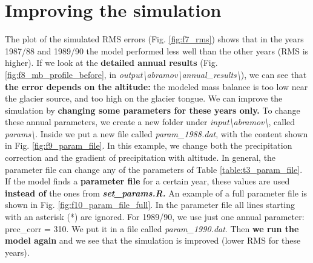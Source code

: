 \documentclass[15pt]{extarticle}
\begin{document}
\section{Improving the simulation}
\noindent The plot of the simulated RMS errors (Fig. \ref{fig:f7_rms}) shows that in the years 1987/88 and 1989/90 the model performed less well than the other years (RMS is higher). If we look at the \textbf{detailed annual results} (Fig. \ref{fig:f8_mb_profile_before}, in \textit{output\textbackslash abramov\textbackslash annual\_results\textbackslash}), we can see that \textbf{the error depends on the altitude:} the modeled mass balance is too low near the glacier source, and too high on the glacier tongue. We can improve the simulation by \textbf{changing some parameters for these years only.}
To change these annual parameters, we create a new folder under \textit{input\textbackslash abramov\textbackslash}, called \textit{params\textbackslash}. Inside we put a new file called \textit{param\_1988.dat}, with the content shown in Fig. \ref{fig:f9_param_file}. In this example, we change both the precipitation correction and the gradient of precipitation with altitude. In general, the parameter file can change any of the parameters of Table \ref{table:t3_param_file}. If the model finds a \textbf{parameter file} for a certain year, these values are used \textbf{instead of} the ones from \textbf{\textit{set\_params.R.}} An example of a full parameter file is shown in Fig. \ref{fig:f10_param_file_full}. In the parameter file all lines starting with an asterisk (*) are ignored. For 1989/90, we use just one annual parameter: prec\_corr = 310. We put it in a file called \textit{param\_1990.dat}. Then \textbf{we run the model again} and we see that the simulation is improved (lower RMS for these years).
\end{document}
